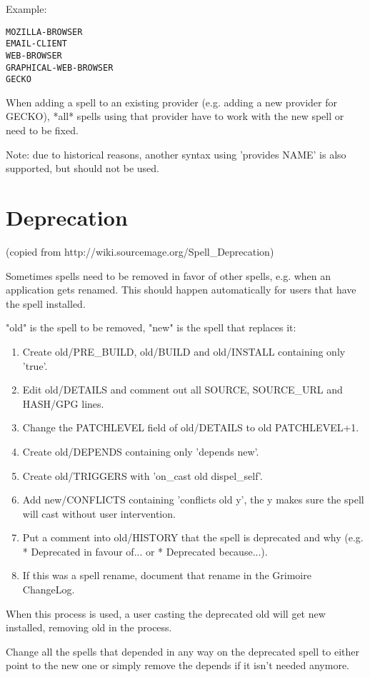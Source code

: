 \documentclass[a4paper,10pt]{book}
\begin{document}
Example:
\begin{verbatim}
MOZILLA-BROWSER
EMAIL-CLIENT
WEB-BROWSER
GRAPHICAL-WEB-BROWSER
GECKO
\end{verbatim}

When adding a spell to an existing provider (e.g. adding a new provider for
GECKO), *all* spells using that provider have to work with the new spell or
need
to be fixed.

Note: due to historical reasons, another syntax using 'provides \textdollar
NAME' is also
supported, but should not be used.

\section{Deprecation}
(copied from http://wiki.sourcemage.org/Spell\_Deprecation)

Sometimes spells need to be removed in favor of other spells, e.g. when an
application gets renamed. This should happen automatically for users that
have the spell installed.

"old" is the spell to be removed, "new" is the spell that replaces it:
\begin{enumerate}
\item Create old/PRE\_BUILD, old/BUILD and old/INSTALL containing only
	'true'.
\item Edit old/DETAILS and comment out all SOURCE, SOURCE\_URL and HASH/GPG
	lines.
\item Change the PATCHLEVEL field of old/DETAILS to old PATCHLEVEL+1.
\item Create old/DEPENDS containing only 'depends new'.
\item Create old/TRIGGERS with 'on\_cast old dispel\_self'.
\item Add new/CONFLICTS containing 'conflicts old y', the y makes sure the
	spell will cast without user intervention.
\item Put a comment into old/HISTORY that the spell is deprecated and why
	(e.g. * Deprecated in favour of... or * Deprecated because...).
\item If this was a spell rename, document that rename in the Grimoire
	ChangeLog.
\end{enumerate}

When this process is used, a user casting the deprecated old will get new
installed, removing old in the process.

Change all the spells that depended in any way on the deprecated spell to
either point to the new one or simply remove the depends if it isn't needed
anymore.
\end{document}
